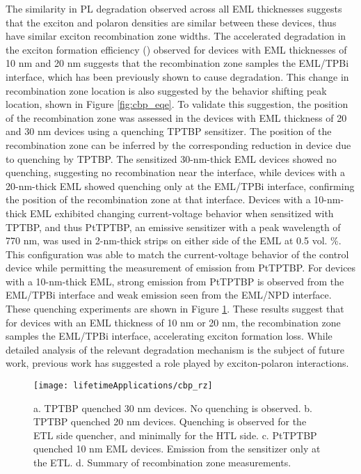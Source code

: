 \documentclass[../thesis.tex]{subfiles}
\begin{document}
The similarity in PL degradation observed across all EML thicknesses suggests that the exciton and polaron densities are similar between these devices,\supercite{Giebink2008a,Coburn2017,Lee2017} thus have similar exciton recombination zone widths.  
The accelerated degradation in the exciton formation efficiency (\ef) observed for devices with EML thicknesses of 10 nm and 20 nm suggests that the recombination zone samples the EML/TPBi interface, which has been previously shown to cause degradation.\supercite{Wang2013,Wang2014}
This change in recombination zone location is also suggested by the \eqe behavior shifting peak location, shown in Figure \ref{fig:cbp_eqe}.
To validate this suggestion, the position of the recombination zone was assessed in the devices with EML thickness of 20 and 30 nm devices using a quenching TPTBP sensitizer.  
The position of the recombination zone can be inferred by the corresponding reduction in device \eqe due to quenching by TPTBP.\supercite{Erickson2013a}
The sensitized 30-nm-thick EML devices showed no quenching, suggesting no recombination near the interface, while devices with a 20-nm-thick EML showed quenching only at the EML/TPBi interface, confirming the position of the recombination zone at that interface.  
Devices with a 10-nm-thick EML exhibited changing current-voltage behavior when sensitized with TPTBP, and thus PtTPTBP, an emissive sensitizer with a peak wavelength of 770 nm, was used in 2-nm-thick strips on either side of the EML at 0.5 vol. \%.
This configuration was able to match the current-voltage behavior of the control device while permitting the measurement of emission from PtTPTBP.  
For devices with a 10-nm-thick EML, strong emission from PtTPTBP is observed from the EML/TPBi interface and weak emission seen from the EML/NPD interface. 
These quenching experiments are shown in Figure \ref{fig:cbp_rz}.
These results suggest that for devices with an EML thickness of 10 nm or 20 nm, the recombination zone samples the EML/TPBi interface, accelerating exciton formation loss.  
While detailed analysis of the relevant degradation mechanism is the subject of future work, previous work has suggested a role played by exciton-polaron interactions.\supercite{Wang2015a,Zhang2016,Giebink2008a,Kondakov2007d,Kondakov2003}

\begin{figure}[hb]
\centering
\texttt{[image: lifetimeApplications/cbp\_rz]}
\caption{a. TPTBP quenched 30 nm devices.  No quenching is observed.  b. TPTBP quenched 20 nm devices.  Quenching is observed for the ETL side quencher, and minimally for the HTL side. c. PtTPTBP quenched 10 nm EML devices. Emission from the sensitizer only at the ETL. d. Summary of recombination zone measurements.}
\label{fig:cbp_rz}
\end{figure}
\end{document}
